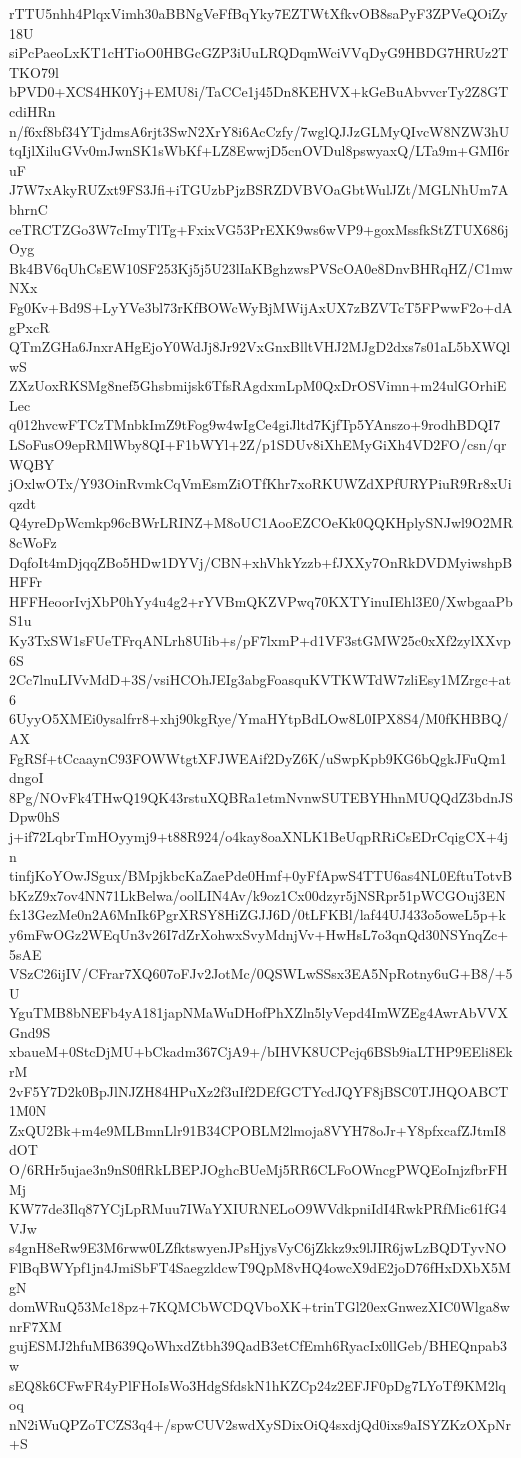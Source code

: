 rTTU5nhh4PlqxVimh30aBBNgVeFfBqYky7EZTWtXfkvOB8saPyF3ZPVeQOiZy18U
siPcPaeoLxKT1cHTioO0HBGcGZP3iUuLRQDqmWciVVqDyG9HBDG7HRUz2TTKO79l
bPVD0+XCS4HK0Yj+EMU8i/TaCCe1j45Dn8KEHVX+kGeBuAbvvcrTy2Z8GTcdiHRn
n/f6xf8bf34YTjdmsA6rjt3SwN2XrY8i6AcCzfy/7wglQJJzGLMyQIvcW8NZW3hU
tqIjlXiluGVv0mJwnSK1sWbKf+LZ8EwwjD5cnOVDul8pswyaxQ/LTa9m+GMI6ruF
J7W7xAkyRUZxt9FS3Jfi+iTGUzbPjzBSRZDVBVOaGbtWulJZt/MGLNhUm7AbhrnC
ceTRCTZGo3W7cImyTlTg+FxixVG53PrEXK9ws6wVP9+goxMssfkStZTUX686jOyg
Bk4BV6qUhCsEW10SF253Kj5j5U23lIaKBghzwsPVScOA0e8DnvBHRqHZ/C1mwNXx
Fg0Kv+Bd9S+LyYVe3bl73rKfBOWcWyBjMWijAxUX7zBZVTcT5FPwwF2o+dAgPxcR
QTmZGHa6JnxrAHgEjoY0WdJj8Jr92VxGnxBlltVHJ2MJgD2dxs7s01aL5bXWQlwS
ZXzUoxRKSMg8nef5Ghsbmijsk6TfsRAgdxmLpM0QxDrOSVimn+m24ulGOrhiELec
q012hvcwFTCzTMnbkImZ9tFog9w4wIgCe4giJltd7KjfTp5YAnszo+9rodhBDQI7
LSoFusO9epRMlWby8QI+F1bWYl+2Z/p1SDUv8iXhEMyGiXh4VD2FO/csn/qrWQBY
jOxlwOTx/Y93OinRvmkCqVmEsmZiOTfKhr7xoRKUWZdXPfURYPiuR9Rr8xUiqzdt
Q4yreDpWcmkp96cBWrLRINZ+M8oUC1AooEZCOeKk0QQKHplySNJwl9O2MR8cWoFz
DqfoIt4mDjqqZBo5HDw1DYVj/CBN+xhVhkYzzb+fJXXy7OnRkDVDMyiwshpBHFFr
HFFHeoorIvjXbP0hYy4u4g2+rYVBmQKZVPwq70KXTYinuIEhl3E0/XwbgaaPbS1u
Ky3TxSW1sFUeTFrqANLrh8UIib+s/pF7lxmP+d1VF3stGMW25c0xXf2zylXXvp6S
2Cc7lnuLIVvMdD+3S/vsiHCOhJEIg3abgFoasquKVTKWTdW7zliEsy1MZrgc+at6
6UyyO5XMEi0ysalfrr8+xhj90kgRye/YmaHYtpBdLOw8L0IPX8S4/M0fKHBBQ/AX
FgRSf+tCcaaynC93FOWWtgtXFJWEAif2DyZ6K/uSwpKpb9KG6bQgkJFuQm1dngoI
8Pg/NOvFk4THwQ19QK43rstuXQBRa1etmNvnwSUTEBYHhnMUQQdZ3bdnJSDpw0hS
j+if72LqbrTmHOyymj9+t88R924/o4kay8oaXNLK1BeUqpRRiCsEDrCqigCX+4jn
tinfjKoYOwJSgux/BMpjkbcKaZaePde0Hmf+0yFfApwS4TTU6as4NL0EftuTotvB
bKzZ9x7ov4NN71LkBelwa/oolLIN4Av/k9oz1Cx00dzyr5jNSRpr51pWCGOuj3EN
fx13GezMe0n2A6MnIk6PgrXRSY8HiZGJJ6D/0tLFKBl/laf44UJ433o5oweL5p+k
y6mFwOGz2WEqUn3v26I7dZrXohwxSvyMdnjVv+HwHsL7o3qnQd30NSYnqZc+5sAE
VSzC26ijIV/CFrar7XQ607oFJv2JotMc/0QSWLwSSsx3EA5NpRotny6uG+B8/+5U
YguTMB8bNEFb4yA181japNMaWuDHofPhXZln5lyVepd4ImWZEg4AwrAbVVXGnd9S
xbaueM+0StcDjMU+bCkadm367CjA9+/bIHVK8UCPcjq6BSb9iaLTHP9EEli8EkrM
2vF5Y7D2k0BpJlNJZH84HPuXz2f3uIf2DEfGCTYcdJQYF8jBSC0TJHQOABCT1M0N
ZxQU2Bk+m4e9MLBmnLlr91B34CPOBLM2lmoja8VYH78oJr+Y8pfxcafZJtmI8dOT
O/6RHr5ujae3n9nS0flRkLBEPJOghcBUeMj5RR6CLFoOWncgPWQEoInjzfbrFHMj
KW77de3Ilq87YCjLpRMuu7IWaYXIURNELoO9WVdkpniIdI4RwkPRfMic61fG4VJw
s4gnH8eRw9E3M6rww0LZfktswyenJPsHjysVyC6jZkkz9x9lJIR6jwLzBQDTyvNO
FlBqBWYpf1jn4JmiSbFT4SaegzldcwT9QpM8vHQ4owcX9dE2joD76fHxDXbX5MgN
domWRuQ53Mc18pz+7KQMCbWCDQVboXK+trinTGl20exGnwezXIC0Wlga8wnrF7XM
gujESMJ2hfuMB639QoWhxdZtbh39QadB3etCfEmh6RyacIx0llGeb/BHEQnpab3w
sEQ8k6CFwFR4yPlFHoIsWo3HdgSfdskN1hKZCp24z2EFJF0pDg7LYoTf9KM2lqoq
nN2iWuQPZoTCZS3q4+/spwCUV2swdXySDixOiQ4sxdjQd0ixs9aISYZKzOXpNr+S
